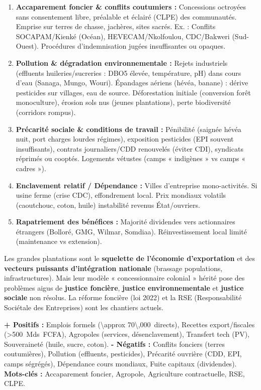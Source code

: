 \documentclass[11pt]{article}
\newcommand{\cle}[1]{{\popxbold\color{popdark}#1}}
\newcounter{popsec}
\newcounter{popsub}
\newcommand{\courssub}[1]{%
  \stepcounter{popsub}%
  \par\vspace{9pt}\noindent{\popxbold\fontsize{11.5}{13}\selectfont\color{popink}{\color{poporange}\thepopsec.\thepopsub}\hspace{6pt}#1}\par\nopagebreak\vspace{4pt}
}
\begin{document}
\begin{attention}
\begin{enumerate}
    \item \textbf{Accaparement foncier \& conflits coutumiers :} Concessions octroyées sans consentement libre, préalable et éclairé (CLPE) des communautés. Emprise sur terres de chasse, jachères, sites sacrés. Ex. : Conflits SOCAPAM/Kienké (Océan), HEVECAM/Nkolfoulou, CDC/Bakweri (Sud-Ouest). Procédures d'indemnisation jugées insuffisantes ou opaques.
    \item \textbf{Pollution \& dégradation environnementale :} Rejets industriels (effluents huileries/sucreries : DBO5 élevée, température, pH) dans cours d'eau (Sanaga, Mungo, Wouri). Épandages aériens (hévéa, banane) : dérive pesticides sur villages, eau de source. Déforestation initiale (conversion forêt \rightarrow monoculture), érosion sols nus (jeunes plantations), perte biodiversité (corridors rompus).
    \item \textbf{Précarité sociale \& conditions de travail :} Pénibilité (saignée hévéa nuit, port charges lourdes régimes), exposition pesticides (EPI souvent insuffisants), contrats journaliers/CDD renouvelés (éviter CDI), syndicats réprimés ou cooptés. Logements vétustes (camps « indigènes » vs camps « cadres »).
    \item \textbf{Enclavement relatif / Dépendance :} Villes d'entreprise mono-activités. Si usine ferme (crise CDC), effondrement local. Prix mondiaux volatils (caoutchouc, coton, huile) \rightarrow instabilité revenus État/ouvriers.
    \item \textbf{Rapatriement des bénéfices :} Majorité dividendes vers actionnaires étrangers (Bolloré, GMG, Wilmar, Somdiaa). Réinvestissement local limité (maintenance vs extension).
\end{enumerate}
\end{attention}

\courssub{Synthèse : Bilan contrasté}
Les grandes plantations sont le \textbf{squelette de l'économie d'exportation} et des \textbf{vecteurs puissants d'intégration nationale} (brassage populations, infrastructures). Mais leur modèle « concessionnaire colonial » hérité pose des problèmes aigus de \textbf{justice foncière}, \textbf{justice environnementale} et \textbf{justice sociale} non résolus. La réforme foncière (loi 2022) et la RSE (Responsabilité Sociétale des Entreprises) sont les chantiers actuels.

\begin{aretenir}
\textbf{+ Positifs :} Emplois formels (\SI{\approx 70\,000}{directs}), Recettes export/fiscales (\SI{>500}{Mds FCFA}), Agropoles (services, désenclavement), Transfert tech (PV), Souveraineté (huile, sucre, coton).
\textbf{- Négatifs :} Conflits fonciers (terres coutumières), Pollution (effluents, pesticides), Précarité ouvrière (CDD, EPI, camps ségrégés), Dépendance cours mondiaux, Fuite capitaux (dividendes).
\textbf{Mots-clés :} \cle{Accaparement foncier}, \cle{Agropole}, \cle{Agriculture contractuelle}, \cle{RSE}, \cle{CLPE}.
\end{aretenir}
\end{document}
